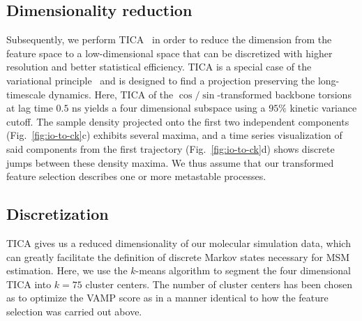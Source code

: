 \documentclass[9pt,tutorial]{livecoms}
\begin{document}
\subsection{Dimensionality reduction}

Subsequently, we perform TICA~\cite{tica,kinetic-maps} in order to reduce the dimension from the feature space to a low-dimensional space that can be discretized with higher resolution and better statistical efficiency. TICA is a special case of the variational principle~\cite{noe-vac,nueske-vamk} and is designed to find a projection preserving the long-timescale dynamics. Here, TICA of the $\cos/\sin$-transformed backbone torsions at lag time $0.5$ ns yields a four dimensional subspace using a $95\%$ kinetic variance cutoff.
The sample density projected onto the first two independent components (Fig.~\ref{fig:io-to-ck}c) exhibits several maxima, and a time series visualization of said components from the first trajectory (Fig.~\ref{fig:io-to-ck}d) shows discrete jumps between these density maxima.
We thus assume that our transformed feature selection describes one or more metastable processes.

\subsection{Discretization}
TICA gives us a reduced dimensionality of our molecular simulation data, which can greatly facilitate the definition of discrete Markov states necessary for MSM estimation. Here, we use the $k$-means algorithm to segment the four dimensional TICA into $k=75$ cluster centers. The number of cluster centers has been chosen as to optimize the VAMP score as in a manner identical to how the feature selection was carried out above.
\end{document}
